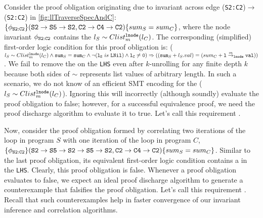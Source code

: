 Consider the proof obligation originating due to  invariant across edge ({\tt S2:C2})$\rightarrow$({\tt S2:C2}) in \cref{fig:llTraverseSpecAndC}:
$\{\phi_{{\tt S2:C2}}\} ({\tt S2\rightarrow S5\rightarrow S2}, {\tt C2\rightarrow C4\rightarrow C2}) \{sum_{S} = sum_{C}\}$, where
the node invariant $\phi_{{\tt S2:C2}}$ contains
the \recursiveRelation{} $l_{S}\sim{}Clist^{{\tt lnode}}_{m}(l_{C})$.
The corresponding (simplified) first-order logic condition for this
proof obligation is:
($l_{S}\sim{}Clist^{{\tt lnode}}_{m}(l_{C}) \land {\tt sum}_S={\tt sum}_C \land \neg({\tt l_S}\ is\ {\tt LNil}) \land {\tt l_C\neq0}) \Rightarrow (({\tt sum}_S + l_S.val) = (sum_C + {\tt l} \overset{m}{\rightarrow}_{{\tt lnode}} {\tt val}))$.
We fail to remove the \recursiveRelation{} on the {\tt LHS} even after
$k$-unrolling for any finite depth $k$ because both sides of $\sim$
represents list values of arbitrary length.
In such a scenario, we do not know of an efficient
SMT encoding for the \recursiveRelation{} ($l_{S}\sim{}Clist^{{\tt lnode}}_{m}(l_{C})$).
Ignoring this \recursiveRelation{} will incorrectly (although soundly) evaluate
the proof obligation to false; however, for a successful equivalence
proof, we need
the proof discharge algorithm to evaluate it to true. Let's call this
requirement .

Now, consider the proof obligation formed by correlating two iterations
of the loop in program $S$ with one iteration of the loop in program $C$,
$\{\phi_{{\tt S2:C2}}\} ({\tt S2\rightarrow S5\rightarrow S2\rightarrow S5\rightarrow S2}, {\tt C2\rightarrow C4\rightarrow C2}) \{sum_{S} = sum_{C}\}$.
Similar to the last proof obligation, its equivalent first-order logic condition contains a \recursiveRelation{} in the {\tt LHS}.
Clearly, this proof obligation is false.
Whenever a proof
obligation evaluates to false, we
expect an ideal proof discharge algorithm to generate a
counterexample that falsifies the proof obligation.
Let's call this
requirement .
Recall that such counterexamples help in faster
convergence of our invariant inference and correlation algorithms.


